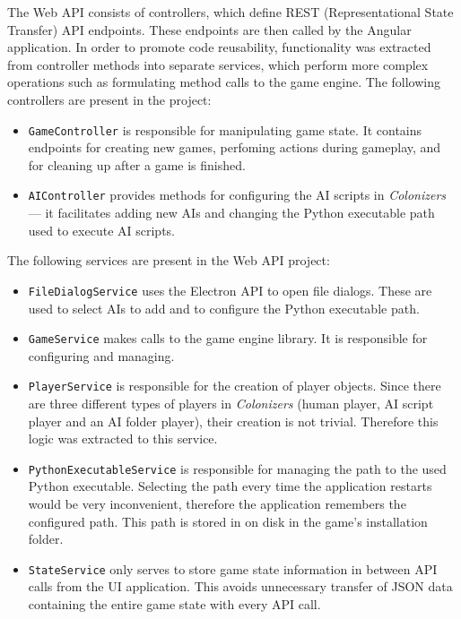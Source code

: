 The Web API consists of controllers, which define REST (Representational
State Transfer) API endpoints. These endpoints are then called by the Angular
application. In order to promote code reusability, functionality was extracted
from controller methods into separate services, which perform more complex operations
such as formulating method calls to the game engine. The following controllers
are present in the project:
\begin{itemize}
    \item \texttt{GameController} is responsible for manipulating game state.
        It contains endpoints for creating new games, perfoming actions during
        gameplay, and for cleaning up after a game is finished.
    \item \texttt{AIController} provides methods for configuring the AI
        scripts in \emph{Colonizers} --- it facilitates adding new AIs
        and changing the Python executable path used to execute AI scripts.
\end{itemize}

The following services are present in the Web API project:
\begin{itemize}
    \item \texttt{FileDialogService} uses the Electron API to open
        file dialogs. These are used to select AIs to add and to
        configure the Python executable path.
    \item \texttt{GameService} makes calls to the game engine library.
        It is responsible for configuring and managing.
    \item \texttt{PlayerService} is responsible for the creation of player
        objects. Since there are three different types of players
        in \emph{Colonizers} (human player, AI script player and an AI folder player),
        their creation is not trivial. Therefore this logic was extracted to this
        service.
    \item \texttt{PythonExecutableService} is responsible for managing
        the path to the used Python executable. Selecting the path every
        time the application restarts would be very inconvenient, therefore
        the application remembers the configured path. This path is stored
        in on disk in the game's installation folder.
    \item \texttt{StateService} only serves to store game state information
        in between API calls from the UI application. This avoids
        unnecessary transfer of JSON data containing the entire game
        state with every API call.
\end{itemize}

